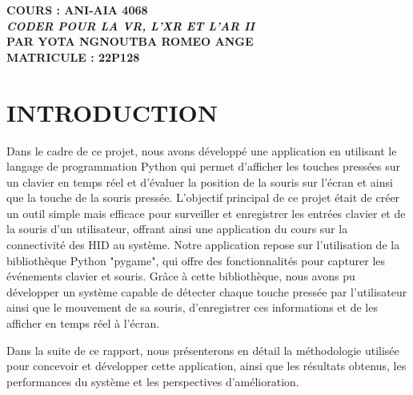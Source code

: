\documentclass[12pt,a4paper]{article}
\begin{document}

\vspace*{5cm}
\begin{center}
\textbf{COURS : ANI-AIA 4068\\
\textit{CODER POUR LA VR, L’XR ET L’AR II} \\
PAR YOTA NGNOUTBA ROMEO ANGE\\
MATRICULE : 22P128\\
}
\end{center}

\newpage
\renewcommand{\contentsname}{SOMMAIRE}

\tableofcontents

\newpage
\section{INTRODUCTION}
\small {Dans le cadre de ce projet, nous avons développé une application en utilisant le langage de programmation Python qui permet d'afficher les touches pressées sur un clavier en temps réel et d’évaluer la position de la souris sur l’écran et ainsi que la touche de la souris pressée. L'objectif principal de ce projet était de créer un outil simple mais efficace pour surveiller et enregistrer les entrées clavier et de la souris d'un utilisateur, offrant ainsi une application du cours sur la connectivité des HID au système.
Notre application repose sur l'utilisation de la bibliothèque Python "pygame", qui offre des fonctionnalités pour capturer les événements clavier et souris. Grâce à cette bibliothèque, nous avons pu développer un système capable de détecter chaque touche pressée par l'utilisateur ainsi que le mouvement de sa souris, d'enregistrer ces informations et de les afficher en temps réel à l'écran.}

\begin{flushleft}
Dans la suite de ce rapport, nous présenterons en détail la méthodologie utilisée pour concevoir et développer cette application, ainsi que les résultats obtenus, les performances du système et les perspectives d'amélioration.
\end{flushleft}

\newpage
\end{document}

